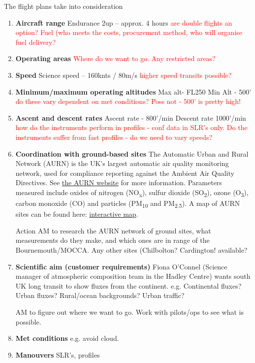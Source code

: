 \documentclass[11pt]{article} %
\begin{document}
The flight plans take into consideration
\begin{enumerate}
\item \textbf{Aircraft range}
Endurance 2up – approx. 4 hours
\textcolor{red}{are double flights an option? Fuel (who meets the costs, procurement method, who will organise fuel delivery?}

\item \textbf{Operating areas}
\textcolor{red}{Where do we want to go. Any restricted areas?}

\item \textbf{Speed}
Science speed – 160knts / 80m/s 
\textcolor{red}{higher speed transits possible?}

\item \textbf{Minimum/maximum operating altitudes}
Max alt-  FL250
Min Alt - 500’
\textcolor{red}{do these vary dependent on met conditions? Poss not - 500' is pretty high!}

\item \textbf{Ascent and descent rates}
Ascent rate -  800’/min
Descent rate 1000’/min 
\textcolor{red}{how do the instruments perform in profiles - conf data in SLR's only. Do the instruments suffer from fast profiles - do we need to vary speeds?}

\item \textbf{Coordination with ground-based sites}
The Automatic Urban and Rural Network (AURN) is the UK's largest automatic air quality monitoring network, used for compliance reporting against the Ambient Air Quality Directives. See \href{https://uk-air.defra.gov.uk/networks/network-info?view=aurn}{the AURN website} for more information. Parameters measured include oxides of nitrogen (NO\textsubscript{x}), sulfur dioxide (SO\textsubscript{2}), ozone (O\textsubscript{3}), carbon monoxide (CO) and particles (PM\textsubscript{10} and PM\textsubscript{2.5}). A map of AURN sites can be found here: \href{https://uk-air.defra.gov.uk/interactive-map?network=aurn}{interactive map}.

Action AM to research the AURN network of ground sites, what measurements do they make, and which ones are in range of the Bournemouth/MOCCA.
Any other sites (Chilbolton? Cardington! available?

\item \textbf{Scientific aim (customer requirements)}
Fiona O'Connel (Science manager of atmospheric composition team in the Hadley Centre) wants south UK long transit to show fluxes from the continent.
e.g. Continental fluxes? Urban fluxes? Rural/ocean backgrounds? Urban traffic?

AM to figure out where we want to go. Work with pilots/ops to see what is possible. 

\item \textbf{Met conditions}
e.g. avoid cloud. 

\item \textbf{Manouvers}
SLR's, profiles
\end{enumerate}
\end{document}

